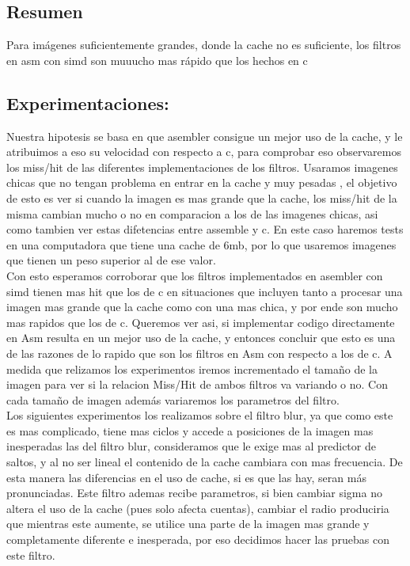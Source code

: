 \subsection{Resumen}

Para imágenes suficientemente grandes, donde la cache no es suficiente, los filtros en asm con simd son muuucho mas rápido que los hechos en c

\subsection{Experimentaciones:}

Nuestra hipotesis se basa en que asembler consigue un mejor uso de la cache, y le atribuimos a eso su velocidad con respecto a c, para comprobar eso observaremos los miss/hit de las diferentes implementaciones de los filtros. Usaramos imagenes chicas que no tengan problema en entrar en la cache y muy pesadas , el objetivo de esto es ver si cuando la imagen es mas grande que la cache, los miss/hit de la misma cambian mucho o no en comparacion a los de las imagenes chicas, asi como tambien ver estas difetencias entre assemble y c. En este caso haremos tests en una computadora que tiene una cache de 6mb, por lo que usaremos imagenes que tienen un peso superior al de ese valor. \\


Con esto esperamos corroborar que los filtros implementados en asembler con simd tienen mas hit que los de c en situaciones que incluyen tanto a procesar una imagen mas grande que la cache como con una mas chica, y por ende son mucho mas rapidos que los de c. Queremos ver asi, si implementar codigo directamente en Asm resulta en un mejor uso de la cache, y entonces concluir que esto es una de las razones de lo rapido que son los filtros en Asm con respecto a los de c. A medida que relizamos los experimentos iremos incrementado el tamaño de la imagen para ver si la relacion Miss/Hit de ambos filtros va variando o no. Con cada tamaño de imagen además variaremos los parametros del filtro. \\


Los siguientes experimentos los realizamos sobre el filtro blur, ya que como este es mas complicado, tiene mas ciclos y accede a posiciones de la imagen mas inesperadas las del filtro blur, consideramos que le exige mas al predictor de saltos, y al no ser lineal el contenido de la cache cambiara con mas frecuencia. De esta manera las diferencias en el uso de cache, si es que las hay, seran más pronunciadas. Este filtro ademas recibe parametros, si bien cambiar sigma no altera el uso de la cache (pues solo afecta cuentas), cambiar el radio produciria que mientras este aumente, se utilice una parte de la imagen mas grande y completamente diferente e inesperada, por eso decidimos hacer las pruebas con este filtro. \\


